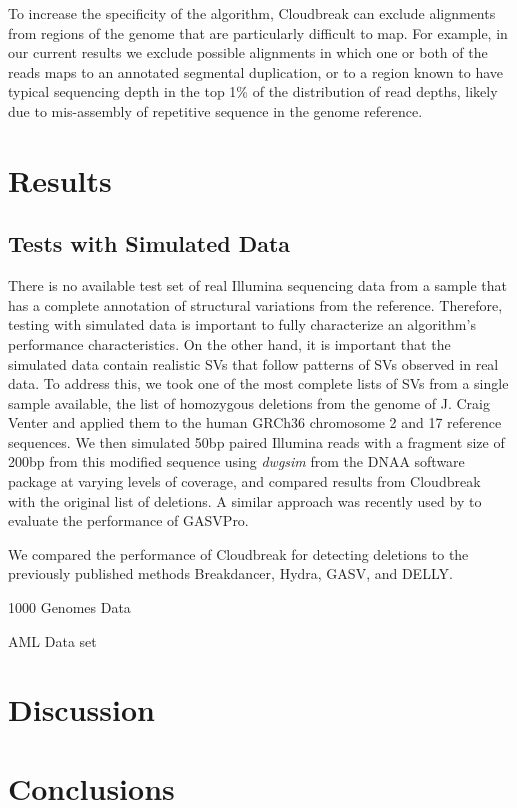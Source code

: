 \documentclass[12pt]{article}
\begin{document}
To increase the specificity of the algorithm, Cloudbreak can exclude alignments from regions of the genome that are particularly difficult to map. For example, in our current results we exclude possible alignments in which one or both of the reads maps to an annotated segmental duplication, or to a region known to have typical sequencing depth in the top 1\% of the distribution of read depths, likely due to mis-assembly of repetitive sequence in the genome reference. \cite{Pickrell:2011du}

\section{Results}\label{results}

\subsection{Tests with Simulated Data}

There is no available test set of real Illumina sequencing data from a sample that has a complete annotation of structural variations from the reference. Therefore, testing with simulated data is important to fully characterize an algorithm's performance characteristics. On the other hand, it is important that the simulated data contain realistic SVs that follow patterns of SVs observed in real data. To address this, we took one of the most complete lists of SVs from a single sample available, the list of homozygous deletions from the genome of J. Craig Venter \cite{Levy:2007fb} and applied them to the human GRCh36 chromosome 2 and 17 reference sequences. We then simulated 50bp paired Illumina reads with a fragment size of 200bp from this modified sequence using \emph{dwgsim} from the DNAA software package \cite{DNAA} at varying levels of coverage, and compared results from Cloudbreak with the original list of deletions. A similar approach was recently used by \cite{Sindi:2012kk} to evaluate the performance of GASVPro.

We compared the performance of Cloudbreak for detecting deletions to the previously published methods Breakdancer, \cite{Chen:2009p3} Hydra, \cite{Quinlan:2010gf} GASV, \cite{Sindi:2009gu} and DELLY. \cite{Rausch:2012he} 

1000 Genomes Data

AML Data set

\section{Discussion}\label{discussion}



\section{Conclusions}\label{conclusions}





\end{document}
